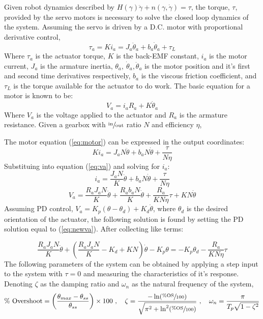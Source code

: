 Given robot dynamics described by \(H(\gamma)\ddot{\gamma} + n(\gamma,\dot{\gamma}) = \tau\), the torque, $\tau$, provided by the servo motors is necessary to solve the closed loop dynamics of the system. Assuming the servo is driven by a D.C. motor with proportional derivative control,
\begin{equation}
  \tau_a = Ki_a = J_a\ddot{\theta}_a + b_a\dot{\theta}_a + \tau_L
  \label{eq:motor}
\end{equation}
Where $\tau_a$ is the actuator torque, $K$ is the back-EMF constant, $i_a$ is the motor current, $J_a$ is the armature inertia, $\theta_a,~\dot{\theta}_a,\ddot{\theta}_a$ is the motor position and it's first and second time derivatives respectively, $b_a$ is the viscous friction coefficient, and $\tau_L$ is the torque available for the actuator to do work. The basic equation for a motor is known to be:
\begin{equation}
  V_a = i_aR_a + K\dot{\theta}_a
  \label{eq:va}
\end{equation}
Where $V_a$ is the voltage applied to the actuator and $R_a$ is the armature resistance. Given a gearbox with $\sfrac{\text{in}}{\text{out}}$ ratio $N$ and efficiency $\eta$,

The motor equation (\ref{eq:motor}) can be expressed in the output coordinates:
\[
Ki_a = J_aN\ddot{\theta} + b_aN\dot{\theta} + \frac{\tau}{N\eta}
\]
Substituing into equation (\ref{eq:va}) and solving for $i_a$:
\[
  i_a = \frac{J_aN}{K}\ddot{\theta} + b_aN\dot{\theta} + \frac{\tau}{N\eta}
\]
\begin{equation}
  V_a = \frac{R_aJ_aN}{K}\ddot{\theta} + \frac{R_ab_aN}{K}\dot{\theta} + \frac{R_a}{KN\eta}\tau + KN\dot{\theta}
  \label{eq:newva}
\end{equation}
Assuming PD control, \(V_a = K_p(\theta-\theta_d) + K_d\dot{\theta}\), where $\theta_d$ is the desired orientation of the actuator, the following solution is found by setting the PD solution equal to (\ref{eq:newva}). After collecting like terms:

\begin{equation}
  \frac{R_aJ_aN}{K}\ddot{\theta} + \left( \frac{R_aJ_aN}{K} - K_d + KN \right)\dot{\theta} - K_p\theta = -K_p\theta_d - \frac{R_a}{KN\eta}\tau
  \label{eq:end1}
\end{equation}
\newpage
The following parameters of the system can be obtained by applying a step input to the system with $\tau=0$ and measuring the characteristics of it's response. Denoting $\zeta$ as the damping ratio and $\omega_n$ as the natural frequency of the system,
\[
  \text{\% Overshoot} = \left( \frac{\theta_{max} - \theta_{ss}}{\theta_{ss}} \right) \times 100~,\quad \zeta = \frac{-\ln(\sfrac{\%\text{OS}}{100})}{\sqrt{\pi^2 + \ln^2(\sfrac{\%\text{OS}}{100})}}~,\quad \omega_n = \frac{\pi}{T_p\sqrt{1-\zeta^2}}
\]

